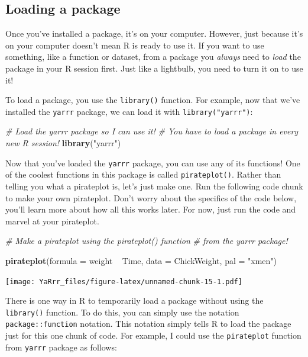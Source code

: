 \documentclass[]{book}
\newenvironment{Shaded}{\begin{snugshade}}{\end{snugshade}}
\newcommand{\KeywordTok}[1]{\textcolor[rgb]{0.13,0.29,0.53}{\textbf{{#1}}}}
\newcommand{\DataTypeTok}[1]{\textcolor[rgb]{0.13,0.29,0.53}{{#1}}}
\newcommand{\StringTok}[1]{\textcolor[rgb]{0.31,0.60,0.02}{{#1}}}
\newcommand{\CommentTok}[1]{\textcolor[rgb]{0.56,0.35,0.01}{\textit{{#1}}}}
\newcommand{\NormalTok}[1]{{#1}}
\theoremstyle{definition}
\theoremstyle{definition}
\theoremstyle{remark}
\begin{document}
\subsection{Loading a package}\label{loading-a-package}

Once you've installed a package, it's on your computer. However, just
because it's on your computer doesn't mean R is ready to use it. If you
want to use something, like a function or dataset, from a package you
\emph{always} need to \emph{load} the package in your R session first.
Just like a lightbulb, you need to turn it on to use it!

To load a package, you use the \texttt{library()} function. For example,
now that we've installed the \texttt{yarrr} package, we can load it with
\texttt{library("yarrr")}:

\begin{Shaded}
\begin{Highlighting}[]
\CommentTok{# Load the yarrr package so I can use it!}
\CommentTok{#   You have to load a package in every new R session!}
\KeywordTok{library}\NormalTok{(}\StringTok{"yarrr"}\NormalTok{)}
\end{Highlighting}
\end{Shaded}

Now that you've loaded the \texttt{yarrr} package, you can use any of
its functions! One of the coolest functions in this package is called
\texttt{pirateplot()}. Rather than telling you what a pirateplot is,
let's just make one. Run the following code chunk to make your own
pirateplot. Don't worry about the specifics of the code below, you'll
learn more about how all this works later. For now, just run the code
and marvel at your pirateplot.

\begin{Shaded}
\begin{Highlighting}[]
\CommentTok{# Make a pirateplot using the pirateplot() function}
\CommentTok{#  from the yarrr package!}

\KeywordTok{pirateplot}\NormalTok{(}\DataTypeTok{formula =} \NormalTok{weight ~}\StringTok{ }\NormalTok{Time, }
           \DataTypeTok{data =} \NormalTok{ChickWeight,}
           \DataTypeTok{pal =} \StringTok{"xmen"}\NormalTok{)}
\end{Highlighting}
\end{Shaded}

\texttt{[image: YaRrr\_files/figure-latex/unnamed-chunk-15-1.pdf]}

There is one way in R to temporarily load a package without using the
\texttt{library()} function. To do this, you can simply use the notation
\texttt{package::function} notation. This notation simply tells R to
load the package just for this one chunk of code. For example, I could
use the \texttt{pirateplot} function from \texttt{yarrr} package as
follows:
\end{document}
